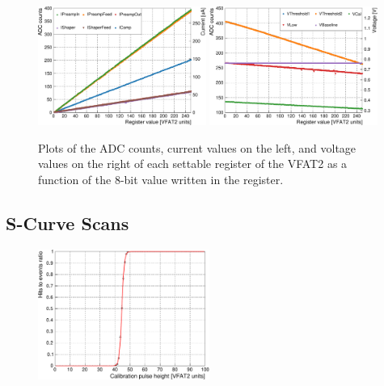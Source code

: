       \begin{figure}[h!]
        \centering
        \includegraphics[width=0.49\textwidth]{img/plots/cADC_Current-crop}
        \includegraphics[width=0.49\textwidth]{img/plots/cADC_Voltage-crop}
        \caption{Plots of the ADC counts, current values on the left, and voltage values on the right of each settable register of the VFAT2 as a function of the 8-bit value written in the register.}
        \label{fig:II-5-qualification-adc}
      \end{figure}

    \subsection{S-Curve Scans}

      \begin{figure}[h!]
        \centering
        \includegraphics[width=0.5\textwidth]{img/plots/cSCurve_T25-crop}
        \caption{}
        \label{fig:II-5-qualification-scurve}
      \end{figure}

